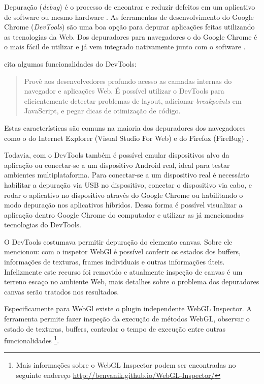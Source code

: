 Depuração (\textit{debug}) é o processo de encontrar e
reduzir defeitos em um aplicativo de software ou mesmo hardware
\autocite{depuracao}. As ferramentas de desenvolvimento do Google Chrome
(\textit{DevTools}) são uma boa opção para depurar aplicações
feitas utilizando as tecnologias da Web. Dos depuradores para
navegadores o do Google Chrome é o mais fácil de utilizar e já vem
integrado nativamente junto com o software \autocite{gamesDebug}.

\noindent \citet{chromeDevTools} cita algumas funcionalidades do DevTools:
\begin{quote}
Provê aos desenvolvedores profundo acesso as camadas internas do
navegador e aplicações Web. É possível utilizar o DevTools
para eficientemente detectar problemas de layout, adicionar
\textit{breakpoints} em JavaScript, e pegar dicas de otimização de
código.
\end{quote}

Estas características são comuns na maioria dos depuradores dos
navegadores como o do Internet Explorer (Visual Studio For Web) e do
Firefox (FireBug) \autocite{gamesDebug}.

Todavia, com o DevTools também é possível emular dispositivos alvo da
aplicação ou conectar-se a um dispositivo Android real, ideal para
testar ambientes multiplataforma. Para conectar-se a um dispositivo real
é necessário habilitar a depuração via USB no dispositivo, conectar
o dispositivo via cabo, e rodar o aplicativo no dispositivo através
do Google Chrome ou habilitando o modo depuração nos aplicativos
híbridos. Dessa forma é possível visualizar a aplicação dentro
Google Chrome do computador e utilizar as já mencionadas tecnologias do
DevTools.

O DevTools costumava permitir depuração do elemento canvas. Sobre ele
\citet{html5mostwanted} mencionou: com o inspetor WebGl é possível
conferir os estados dos buffers, informações de texturas, frames
individuais e outras informações úteis. Infelizmente este recurso
foi removido e atualmente inspeção de canvas é um terreno escaço
no ambiente Web, mais detalhes sobre o problema dos depuradores canvas
serão tratados nos resultados.

Especificamente para WebGl existe o plugin independente WebGL Inspector.
A ferramenta permite fazer inspeção da execução de métodos
WebGL, observar o estado de texturas, buffers, controlar o tempo de
execução entre outras funcionalidades \footnote{Mais informações
sobre o WebGL Inspector podem ser encontradas no seguinte endereço
\url{http://benvanik.github.io/WebGL-Inspector/}}.

